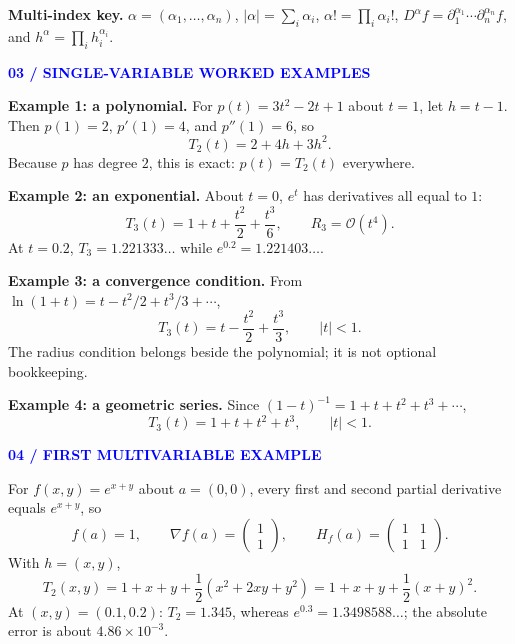 \documentclass[10.5pt]{article}
\newcommand{\tagline}[1]{\par\medskip\textcolor{blue}{\sffamily\footnotesize\bfseries #1}\par\vspace{1pt}}
\begin{document}
\begin{graybox}
\textbf{Multi-index key.} $\alpha=(\alpha_1,\ldots,\alpha_n)$, $|\alpha|=\sum_i\alpha_i$, $\alpha!=\prod_i\alpha_i!$, $D^\alpha f=\partial_1^{\alpha_1}\cdots\partial_n^{\alpha_n}f$, and $h^\alpha=\prod_i h_i^{\alpha_i}$. 
\end{graybox}
\tagline{03 / SINGLE-VARIABLE WORKED EXAMPLES}
\textbf{Example 1: a polynomial.} For $p(t)=3t^2-2t+1$ about $t=1$, let $h=t-1$. Then $p(1)=2$, $p'(1)=4$, and $p''(1)=6$, so
\[
\boxed{T_2(t)=2+4h+3h^2.}
\]
Because $p$ has degree $2$, this is exact: $p(t)=T_2(t)$ everywhere.

\textbf{Example 2: an exponential.} About $t=0$, $e^t$ has derivatives all equal to $1$:
\[
\boxed{T_3(t)=1+t+\frac{t^2}{2}+\frac{t^3}{6}},\qquad R_3=\mathcal O(t^4).
\]
At $t=0.2$, $T_3=1.221333\ldots$ while $e^{0.2}=1.221403\ldots$.

\textbf{Example 3: a convergence condition.} From $\ln(1+t)=t-t^2/2+t^3/3+\cdots$,
\[
\boxed{T_3(t)=t-\frac{t^2}{2}+\frac{t^3}{3}},\qquad |t|<1.
\]
The radius condition belongs beside the polynomial; it is not optional bookkeeping.

\textbf{Example 4: a geometric series.} Since $(1-t)^{-1}=1+t+t^2+t^3+\cdots$,
\[
\boxed{T_3(t)=1+t+t^2+t^3},\qquad |t|<1.
\]
\tagline{04 / FIRST MULTIVARIABLE EXAMPLE}
For $f(x,y)=e^{x+y}$ about $a=(0,0)$, every first and second partial derivative equals $e^{x+y}$, so
\[
f(a)=1,\qquad \nabla f(a)=\begin{pmatrix}1\\1\end{pmatrix},\qquad H_f(a)=\begin{pmatrix}1&1\\1&1\end{pmatrix}.
\]
With $h=(x,y)$,
\[
\boxed{T_2(x,y)=1+x+y+\frac12(x^2+2xy+y^2)=1+x+y+\frac12(x+y)^2.}
\]
At $(x,y)=(0.1,0.2)$: $T_2=1.345$, whereas $e^{0.3}=1.3498588\ldots$; the absolute error is about $4.86\times10^{-3}$.
\vfill
\begin{center}\end{center}
\end{document}
